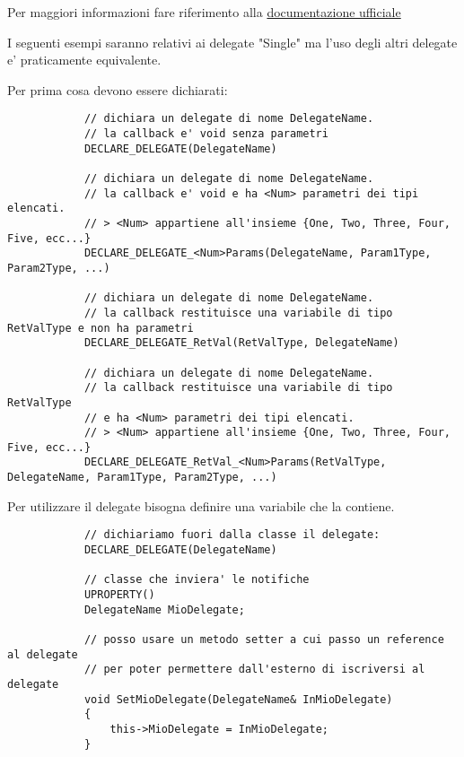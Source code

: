         \begin{notebox}
            Per maggiori informazioni fare riferimento alla \href{https://docs.unrealengine.com/4.26/en-US/ProgrammingAndScripting/ProgrammingWithCPP/UnrealArchitecture/Delegates/}{documentazione ufficiale}
        \end{notebox}

        I seguenti esempi saranno relativi ai delegate "Single" ma l'uso degli altri delegate e' praticamente equivalente.

        Per prima cosa devono essere dichiarati:
        \begin{verbatim}
            // dichiara un delegate di nome DelegateName.
            // la callback e' void senza parametri
            DECLARE_DELEGATE(DelegateName)

            // dichiara un delegate di nome DelegateName.
            // la callback e' void e ha <Num> parametri dei tipi elencati.
            // > <Num> appartiene all'insieme {One, Two, Three, Four, Five, ecc...}
            DECLARE_DELEGATE_<Num>Params(DelegateName, Param1Type, Param2Type, ...)

            // dichiara un delegate di nome DelegateName.
            // la callback restituisce una variabile di tipo RetValType e non ha parametri
            DECLARE_DELEGATE_RetVal(RetValType, DelegateName)

            // dichiara un delegate di nome DelegateName.
            // la callback restituisce una variabile di tipo RetValType
            // e ha <Num> parametri dei tipi elencati.
            // > <Num> appartiene all'insieme {One, Two, Three, Four, Five, ecc...}
            DECLARE_DELEGATE_RetVal_<Num>Params(RetValType, DelegateName, Param1Type, Param2Type, ...)
        \end{verbatim}

        Per utilizzare il delegate bisogna definire una variabile che la contiene.
        \begin{verbatim}
            // dichiariamo fuori dalla classe il delegate:
            DECLARE_DELEGATE(DelegateName)

            // classe che inviera' le notifiche
            UPROPERTY()
            DelegateName MioDelegate;

            // posso usare un metodo setter a cui passo un reference al delegate
            // per poter permettere dall'esterno di iscriversi al delegate
            void SetMioDelegate(DelegateName& InMioDelegate)
            {
                this->MioDelegate = InMioDelegate;
            }
        \end{verbatim}

